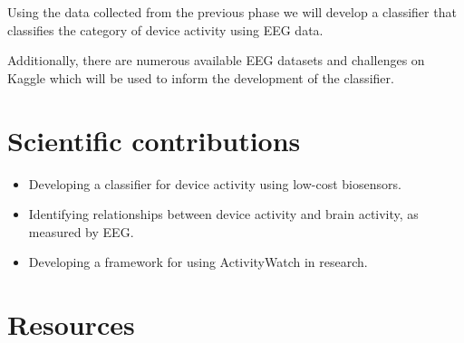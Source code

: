 \documentclass{IEEEtran}
\begin{document}
\begin{refsection}
Using the data collected from the previous phase we will develop a classifier that classifies the category of device activity using EEG data.

Additionally, there are numerous available EEG datasets and challenges on Kaggle which will be used to inform the development of the classifier.




%




\section{Scientific contributions}

\begin{itemize}
  \item Developing a classifier for device activity using low-cost biosensors.
  \item Identifying relationships between device activity and brain activity, as measured by EEG\@.
  \item Developing a framework for using ActivityWatch in research.
\end{itemize}


\section{Resources}


\end{refsection}
\end{document}
